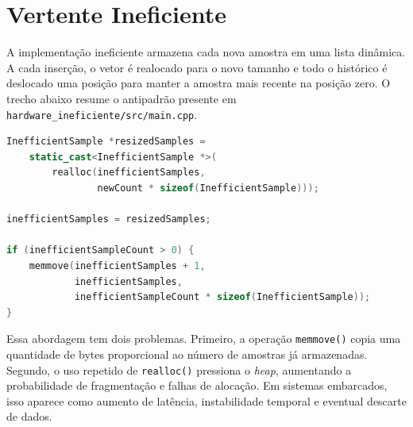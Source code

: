 \documentclass[12pt,a4paper]{article}
\begin{document}
\begin{table}[H]
\centering
\caption{Comparação conceitual entre as vertentes.}
\small
\setlength{\tabcolsep}{5pt}
\end{table}

\section{Vertente Ineficiente}

A implementação ineficiente armazena cada nova amostra em uma lista dinâmica. A cada inserção, o vetor é realocado para o novo tamanho e todo o histórico é deslocado uma posição para manter a amostra mais recente na posição zero. O trecho abaixo resume o antipadrão presente em \texttt{hardware\_ineficiente/src/main.cpp}.

\begin{lstlisting}[style=codestyle,language=C++]
InefficientSample *resizedSamples =
    static_cast<InefficientSample *>(
        realloc(inefficientSamples,
                newCount * sizeof(InefficientSample)));

inefficientSamples = resizedSamples;

if (inefficientSampleCount > 0) {
    memmove(inefficientSamples + 1,
            inefficientSamples,
            inefficientSampleCount * sizeof(InefficientSample));
}
\end{lstlisting}

Essa abordagem tem dois problemas. Primeiro, a operação \texttt{memmove()} copia uma quantidade de bytes proporcional ao número de amostras já armazenadas. Segundo, o uso repetido de \texttt{realloc()} pressiona o \textit{heap}, aumentando a probabilidade de fragmentação e falhas de alocação. Em sistemas embarcados, isso aparece como aumento de latência, instabilidade temporal e eventual descarte de dados.
\end{document}
